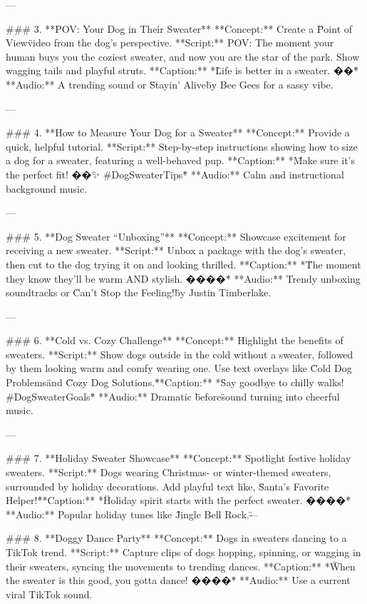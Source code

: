 \documentclass[12pt]{article}
\begin{document}
\begin{enumerate}
\begin{itemize}
---

### 3. **POV: Your Dog in Their Sweater**  
   **Concept:** Create a \"Point of View\" video from the dog’s perspective.  
   **Script:** POV: The moment your human buys you the coziest sweater, and now you are the star of the park. Show wagging tails and playful struts.  
   **Caption:** *\"Life is better in a sweater. ��\"*  
   **Audio:** A trending sound or \"Stayin' Alive\" by Bee Gees for a sassy vibe.

---

### 4. **How to Measure Your Dog for a Sweater**  
   **Concept:** Provide a quick, helpful tutorial.  
   **Script:** Step-by-step instructions showing how to size a dog for a sweater, featuring a well-behaved pup.  
   **Caption:** *\"Make sure it’s the perfect fit! ��✨ #DogSweaterTips\"*  
   **Audio:** Calm and instructional background music.

---

### 5. **Dog Sweater “Unboxing”**  
   **Concept:** Showcase excitement for receiving a new sweater.  
   **Script:** Unbox a package with the dog’s sweater, then cut to the dog trying it on and looking thrilled.  
   **Caption:** *\"The moment they know they’ll be warm AND stylish. ����\"*  
   **Audio:** Trendy unboxing soundtracks or \"Can’t Stop the Feeling!\" by Justin Timberlake.

---

### 6. **Cold vs. Cozy Challenge**  
   **Concept:** Highlight the benefits of sweaters.  
   **Script:** Show dogs outside in the cold without a sweater, followed by them looking warm and comfy wearing one. Use text overlays like \"Cold Dog Problems\" and \"Cozy Dog Solutions.\"  
   **Caption:** *\"Say goodbye to chilly walks! #DogSweaterGoals\"*  
   **Audio:** Dramatic \"before\" sound turning into cheerful music.

---

### 7. **Holiday Sweater Showcase**  
   **Concept:** Spotlight festive holiday sweaters.  
   **Script:** Dogs wearing Christmas- or winter-themed sweaters, surrounded by holiday decorations. Add playful text like, \"Santa’s Favorite Helper!\"  
   **Caption:** *\"Holiday spirit starts with the perfect sweater. ����\"*  
   **Audio:** Popular holiday tunes like \"Jingle Bell Rock.\"

---

### 8. **Doggy Dance Party**  
   **Concept:** Dogs in sweaters dancing to a TikTok trend.  
   **Script:** Capture clips of dogs hopping, spinning, or wagging in their sweaters, syncing the movements to trending dances.  
   **Caption:** *\"When the sweater is this good, you gotta dance! ����\"*  
   **Audio:** Use a current viral TikTok sound.


\end{itemize}
\end{enumerate}
\end{document}
